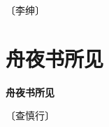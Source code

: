 \documentclass[12pt,UTF-8,openany,fontset=none]{ctexbook}
\begin{document}
\begin{center}
    \vspace{10pt}
    
    \begin{large}
        
        〔李绅〕
        
    \end{large}
    
    \vspace{8pt}
    
    \begin{huge}
        
        \phantom{。}

        \phantom{。}
        
        \phantom{。}

        \phantom{。}
        
    \end{huge}
    
\end{center}

\vspace{8pt}
\clearpage


\section{舟夜书所见}



\begin{center}
    {\bfseries 舟夜书所见}
\end{center}

\begin{center}
    \vspace{10pt}
    
    \begin{large}
        
        〔查慎行〕
        
    \end{large}
    
    \vspace{8pt}
    
    \begin{huge}
        
        \phantom{。}

        \phantom{。}
        
        \phantom{。}

        \phantom{。}
        
    \end{huge}
    
\end{center}
\end{document}
